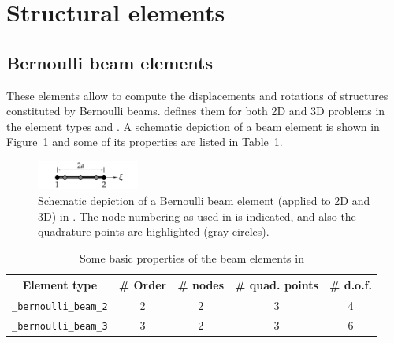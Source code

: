\section{Structural elements}

\subsection*{Bernoulli beam elements}
These elements allow to compute the displacements and rotations of structures constituted by Bernoulli beams. \akantu defines them for both 2D and 3D problems in the element types  and . A schematic depiction of a beam element is shown in Figure~\ref{fig:elements:bernoulli} and some of its properties are listed in Table~\ref{tab:elements:bernoulli}.


\begin{figure}[htb]
  \centering
  \includegraphics[width=0.3\textwidth]{figures/elements/bernoulli_2}
  \caption{Schematic depiction of a Bernoulli beam element (applied to 2D and 3D) in \akantu. The node numbering as used in \akantu is indicated, and also the quadrature points are highlighted (gray circles).}
  \label{fig:elements:bernoulli}
\end{figure}
\begin{table}[htb]
  \centering
  \begin{tabular}{c|cccc}
    \toprule
    Element type                  & \# Order & \# nodes &\# quad. points & \# d.o.f.\\
    \midrule
    \texttt{\_bernoulli\_beam\_2} &         2&         2&              3&  4\\
    \texttt{\_bernoulli\_beam\_3} &         3&         2&              3&  6\\
    \bottomrule
  \end{tabular}
  \caption{Some basic properties of the beam elements in \akantu}
  \label{tab:elements:bernoulli}
\end{table}
